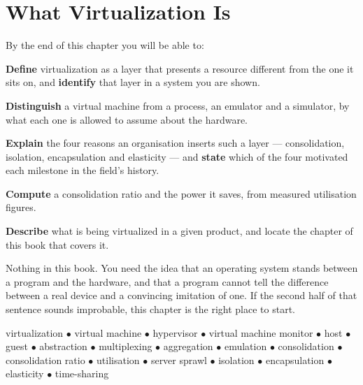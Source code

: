 \chapter{What Virtualization Is}\label{ch:what}

\begin{outcomes}
By the end of this chapter you will be able to:
\begin{tight}
  \item \textbf{Define} virtualization as a layer that presents a resource
        different from the one it sits on, and \textbf{identify} that layer in
        a system you are shown.
  \item \textbf{Distinguish} a virtual machine from a process, an emulator and
        a simulator, by what each one is allowed to assume about the hardware.
  \item \textbf{Explain} the four reasons an organisation inserts such a layer
        --- consolidation, isolation, encapsulation and elasticity --- and
        \textbf{state} which of the four motivated each milestone in the
        field's history.
  \item \textbf{Compute} a consolidation ratio and the power it saves, from
        measured utilisation figures.
  \item \textbf{Describe} what is being virtualized in a given product, and
        locate the chapter of this book that covers it.
\end{tight}
\end{outcomes}

\begin{prereq}
Nothing in this book. You need the idea that an operating system stands between
a program and the hardware, and that a program cannot tell the difference
between a real device and a convincing imitation of one. If the second half of
that sentence sounds improbable, this chapter is the right place to start.
\end{prereq}

\begin{keyterms}
virtualization $\bullet$ virtual machine $\bullet$ hypervisor $\bullet$ virtual
machine monitor $\bullet$ host $\bullet$ guest $\bullet$ abstraction $\bullet$
multiplexing $\bullet$ aggregation $\bullet$ emulation $\bullet$ consolidation
$\bullet$ consolidation ratio $\bullet$ utilisation $\bullet$ server sprawl
$\bullet$ isolation $\bullet$ encapsulation $\bullet$ elasticity $\bullet$
time-sharing
\end{keyterms}

